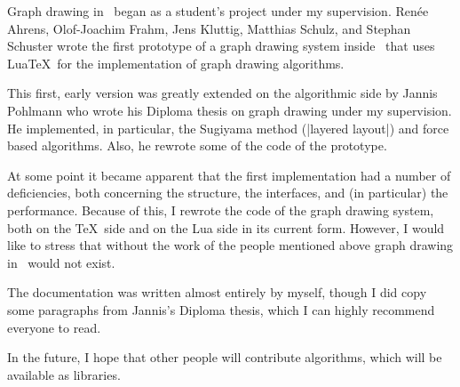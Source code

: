Graph drawing in \tikzname\ began as a student's project under my supervision.
Ren\'ee Ahrens, Olof-Joachim Frahm, Jens Kluttig, Matthias Schulz, and Stephan
Schuster wrote the first prototype of a graph drawing system inside \tikzname\
that uses Lua\TeX\ for the implementation of graph drawing algorithms.

This first, early version was greatly extended on the algorithmic side by
Jannis Pohlmann who wrote his Diploma thesis on graph drawing under my
supervision. He implemented, in particular, the Sugiyama method
(|layered layout|) and force based algorithms. Also, he rewrote some of the
code of the prototype.

At some point it became apparent that the first implementation had a number of
deficiencies, both concerning the structure, the interfaces, and (in
particular) the performance. Because of this, I rewrote the code of the graph
drawing system, both on the \TeX\ side and on the Lua side in its current form.
However, I would like to stress that without the work of the people mentioned
above graph drawing in \tikzname\ would not exist.

The documentation was written almost entirely by myself, though I did copy some
paragraphs from Jannis's Diploma thesis, which I can highly recommend everyone
to read.

In the future, I hope that other people will contribute algorithms, which will
be available as libraries.
